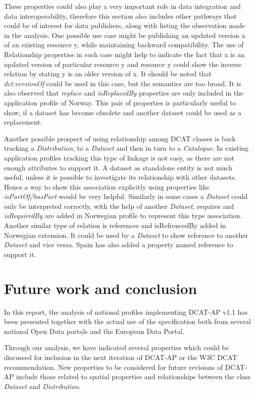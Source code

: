\documentclass[<options>]{elsarticle}
\begin{document}
These properties could also play a very important role in data integration and data interoperability, therefore this section also includes other pathways that could be of interest for data publishers, along with listing the observation made in the analysis. One possible use case might be publishing an updated version x of an existing resource y, while maintaining backward compatibility. The use of Relationship properties in such case might help to indicate the fact that x is an updated version of particular resource y and resource y could show the inverse relation by stating y is an older version of x. It should be noted that \textit{dct:versionOf} could be used in this case, but the semantics are too broad. It is also observed that \textit{replace} and \textit{isReplacedBy} properties are only included in the application profile of Norway. This pair of properties is particularly useful to show, if a dataset has become obsolete and another dataset could be used as a replacement.

Another possible prospect of using relationship among DCAT classes is back tracking a \textit{Distribution}, to a \textit{Dataset} and then in turn to a \textit{Catalogue}. In existing application profiles tracking this type of linkage is not easy, as there are not enough attributes to support it. A dataset as standalone entity is not much useful, unless it is possible to investigate its relationship with other datasets. Hence a way to show this association explicitly using properties like \textit{isPartOf/hasPart }would be very helpful. Similarly in some cases a \textit{Dataset} could only be interpreted correctly, with the help of another \textit{Dataset}, requires and \textit{isRequiredBy} are added in Norwegian profile to represent this type association. Another similar type of relation is references and isRefrencedBy added in Norwegian extension. It could be used by a \textit{Dataset} to show reference to another \textit{Dataset} and vice versa. Spain has also added a property named reference to support it.


\section{Future work and conclusion}
In this report, the analysis of national profiles implementing DCAT-AP v1.1 has been presented together with the actual use of the specification both from several national Open Data portals and the European Data Portal. 

Through our analysis, we have indicated several properties which could be discussed for inclusion in the next iteration of DCAT-AP or the W3C DCAT recommendation. New properties to be considered for future revisions of DCAT-AP include those related to spatial properties and relationships between the class \textit{Dataset} and \textit{Distribution}.
\end{document}
